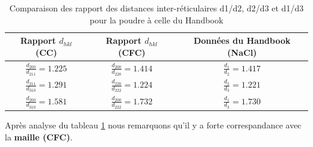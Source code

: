 \begin{flushleft}
\begin{table}[h!]
	\centering
	\begin{tabular}{|c|c|c|}
		\hline
		 Rapport $d_{hkl}$ (CC)  &  Rapport $d_{hkl}$ (CFC) &  Données du Handbook (NaCl)\\
		\hline
		 $\frac{d_{200}}{d_{211}} = 1.225 $ & $\frac{d_{200}}{d_{220}} = 1.414 $  & $\frac{d_{1}}{d_{2}} = 1.417 $  \\
		\hline
		 $\frac{d_{211}}{d_{310}} = 1.291 $ & $\frac{d_{220}}{d_{222}} = 1.224 $  & $\frac{d_{2}}{d_{3}} = 1.221 $  \\
		\hline
		 $\frac{d_{200}}{d_{310}} = 1.581 $ & $\frac{d_{200}}{d_{222}} = 1.732 $  & $\frac{d_{1}}{d_{3}} = 1.730 $ \\
		\hline
	\end{tabular}
	\caption{\centering Comparaison des rapport des distances inter-réticulaires d1/d2, d2/d3 et d1/d3 pour la poudre à celle du Handbook}
	\label{tab:Comparaison des rapport des distances inter-réticulaires d1/d2, d2/d3 et d1/d3 pour la poudre à celle du Handbook}
\end{table}




	Après analyse du tableau \ref{tab:Comparaison des rapport des distances inter-réticulaires d1/d2, d2/d3 et d1/d3 pour la poudre à celle du Handbook}  nous remarquons qu'il y a forte correspandance avec la \textbf{maille (CFC)}. 
	
	

\end{flushleft}


